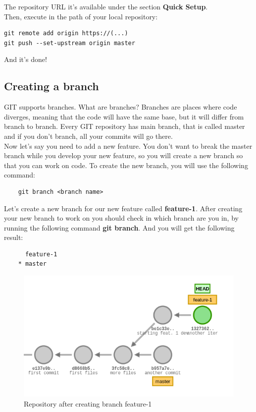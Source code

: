 \documentclass{article}
\begin{document}
The repository URL it's available under the section \textbf{Quick Setup}.\\

Then, execute in the path of your local repository:

\begin{lstlisting}
git remote add origin https://(...)
git push --set-upstream origin master
\end{lstlisting}

And it's done!

\subsection{Creating a branch}

GIT supports branches. What are branches? Branches are places where code diverges, meaning that the code will have the same base, but it will differ from branch to branch. Every GIT repository has main branch, that is called master and if you don't branch, all your commits will go there.\\

Now let's say you need to add a new feature. You don't want to break the master branch while you develop your new feature, so you will create a new branch so that you can work on code. To create the new branch, you will use the following command:

\begin{lstlisting}
	git branch <branch name>
\end{lstlisting}

Let's create a new branch for our new feature called \textbf{feature-1}. After creating your new branch to work on you should check in which branch are you in, by running the following command \textbf{git branch}. And you will get the following result:

\begin{lstlisting}
	  feature-1
	* master
\end{lstlisting}

\begin{figure}[H]
\centerline{\includegraphics[scale=0.5]{repository_after_branch.png}}
\caption{Repository after creating branch feature-1}
\label{fig1}
\end{figure}
\end{document}
